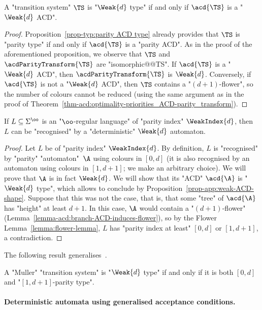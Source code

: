 \documentclass[10pt,a4paper]{amsart}
\renewcommand{\SS}{\Sigma}
\begin{document}
\begin{proposition}\label{prop-app:weak-ACD-shape}
	A "transition system" $\TS$ is "$\Weak{d}$ type" if and only if $\acd{\TS}$ is a "$\Weak{d}$ ACD".
\end{proposition}
\begin{proof}
	Proposition~\ref{prop-typ:parity ACD type} already provides that $\TS$ is "parity type" if and only if $\acd{\TS}$ is a "parity ACD". As in the proof of the aforementioned proposition, we observe that $\TS$ and $\acdParityTransform{\TS}$ are "isomorphic@@TS". If $\acd{\TS}$ is a "$\Weak{d}$ ACD", then $\acdParityTransform{\TS}$ is $\Weak{d}$. Conversely, if $\acd{\TS}$ is not a "$\Weak{d}$ ACD", then $\TS$ contains a "$(d+1)$-flower", so the number of colours cannot be reduced (using the same argument as in the proof of Theorem~\ref{thm-acd:optimality-priorities_ACD-parity_transform}).
\end{proof}


\begin{corollary}\label{cor-app:weak-automata-weaktype}
	If $L\subseteq \SS^\oo$ is an "$\oo$-regular language" of "parity index" $\WeakIndex{d}$, then $L$ can be "recognised" by a "deterministic" $\Weak{d}$ automaton.
\end{corollary}
\begin{proof}
	Let $L$ be of "parity index" $\WeakIndex{d}$. By definition, $L$ is "recognised" by "parity" "automaton"~$\A$ using colours in $[0,d]$ (it is also recognised by an automaton using colours in $[1,d+1]$; we make an arbitrary choice). We will prove that $\A$ is in fact $\Weak{d}$. We will show that its "ACD" $\acd{\A}$ is "$\Weak{d}$ type", which allows to conclude by Proposition~\ref{prop-app:weak-ACD-shape}.
	Suppose that this was not the case, that is, that some "tree" of $\acd{\A}$ has "height" at least $d+1$. In this case, $\A$ would contain a "$(d+1)$-flower" (Lemma~\ref{lemma-acd:branch-ACD-induces-flower}), so by the Flower Lemma~\ref{lemma:flower-lemma}, $L$ has "parity index at least" $[0,d]$ or $[1,d+1]$, a contradiction.
\end{proof}

The following result generalises~\cite[Theorem~2]{BSW01Weakautomata}.
\begin{corollary}
	A "Muller" "transition system" is "$\Weak{d}$ type" if and only if it is both $[0,d]$ and "$[1,d+1]$-parity type".
\end{corollary}



\paragraph*{Deterministic automata using generalised acceptance conditions.}
\end{document}

